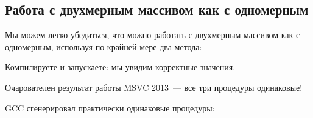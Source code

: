 ﻿\subsection{Работа с двухмерным массивом как с одномерным}

Мы можем легко убедиться, что можно работать с двухмерным массивом как с одномерным,
используя по крайней мере два метода:



Компилируете и запускаете: мы увидим корректные значения.

Очарователен результат работы MSVC 2013~--- все три процедуры одинаковые!



GCC сгенерировал практически одинаковые процедуры:



